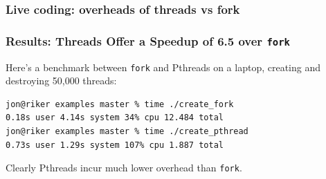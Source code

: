 \documentclass[aspectratio=43]{beamer}
\newenvironment{changemargin}[1]{%
  \begin{list}{}{%
    \setlength{\topsep}{0pt}%
    \setlength{\leftmargin}{#1}%
    \setlength{\rightmargin}{1em}
    \setlength{\listparindent}{\parindent}%
    \setlength{\itemindent}{\parindent}%
    \setlength{\parsep}{\parskip}%
  }%
  \item[]}{\end{list}}
\begin{document}
\begin{frame}[fragile]
  \frametitle{Live coding: overheads of threads vs fork}
\end{frame}

\begin{frame}[fragile]
  \frametitle{Results: Threads Offer a Speedup of 6.5 over {\tt fork}}

  \begin{changemargin}{1cm}
  Here's a benchmark between {\tt fork} and Pthreads on a laptop, creating and
  destroying 50,000 threads:
  \vfill
  \begin{lstlisting}[basicstyle=\scriptsize]
jon@riker examples master % time ./create_fork 
0.18s user 4.14s system 34% cpu 12.484 total
jon@riker examples master % time ./create_pthread 
0.73s user 1.29s system 107% cpu 1.887 total
  \end{lstlisting}
  \vfill
  Clearly Pthreads incur much lower overhead than {\tt fork}.
  \end{changemargin}
\end{frame}
\end{document}
